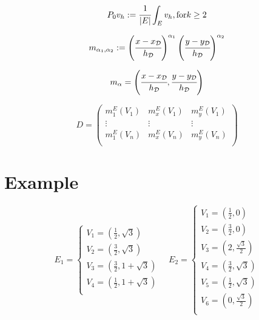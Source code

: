 \documentclass{article}
\begin{document}
\begin{equation}
    P_0v_h := \cfrac{1}{|E|}\int_E v_h, \text{for} k\geq 2
\end{equation}

\begin{equation}
    m_{\alpha_1,\alpha_2} := \left(\cfrac{x - x_{\mathcal{D}}}{h_{\mathcal{D}}}\right)^{\alpha_1}
    \left(\cfrac{y - y_{\mathcal{D}}}{h_{\mathcal{D}}}\right)^{\alpha_2}
\end{equation}

\begin{equation}
    m_{\alpha} = \left(\cfrac{x-x_\mathcal{D}}{h_\mathcal{D}},\cfrac{y-y_\mathcal{D}}{h_\mathcal{D}}\right)
\end{equation}

\begin{equation}
    D = \begin{pmatrix}
        m_1^E(V_1) & m_x^E(V_1) & m_y^E(V_1) \\
        \vdots & \vdots & \vdots \\
        m_1^E(V_n) & m_x^E(V_n) & m_y^E(V_n) \\
    \end{pmatrix}
\end{equation}


\section{Example}


$$E_1 = \begin{cases}
    V_1 = (\frac{1}{2},\sqrt{3}) \\
    V_2 = (\frac{3}{2},\sqrt{3}) \\
    V_3 = (\frac{3}{2},1+\sqrt{3}) \\ 
    V_4 = (\frac{1}{2},1+\sqrt{3}) \\
\end{cases}
\quad
E_2 = \begin{cases}
    V_1 = (\frac{1}{2},0) \\ 
    V_2 = (\frac{3}{2},0) \\ 
    V_3 = (2,\frac{\sqrt{3}}{2}) \\
    V_4 = (\frac{3}{2},\sqrt{3}) \\
    V_5 = (\frac{1}{2}, \sqrt{3}) \\ 
    V_6 = (0, \frac{\sqrt{3}}{2}) \\
\end{cases}$$\\
\end{document}
